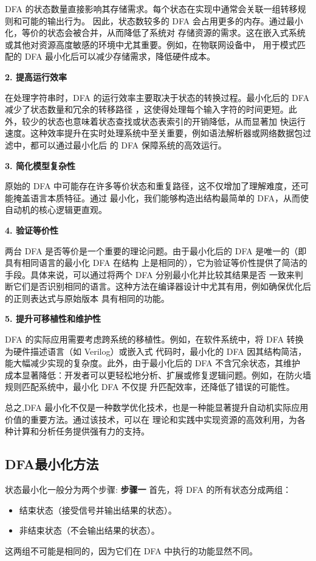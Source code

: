 \documentclass{article}
\begin{document}
DFA 的状态数量直接影响其存储需求。每个状态在实现中通常会关联一组转移规则和可能的输出行为。
因此，状态数较多的 DFA 会占用更多的内存。通过最小化，等价的状态会被合并，从而降低了系统对
存储资源的需求。这在嵌入式系统或其他对资源高度敏感的环境中尤其重要。例如，在物联网设备中，
用于模式匹配的 DFA 最小化后可以减少存储需求，降低硬件成本。

\textbf{2. 提高运行效率}

在处理字符串时，DFA 的运行效率主要取决于状态的转换过程。最小化后的 DFA 减少了状态数量和冗余的转移路径
，这使得处理每个输入字符的时间更短。此外，较少的状态也意味着状态查找或状态表索引的开销降低，从而显著加
快运行速度。这种效率提升在实时处理系统中至关重要，例如语法解析器或网络数据包过滤中，都可以通过最小化后
的 DFA 保障系统的高效运行。

\textbf{3. 简化模型复杂性}

原始的 DFA 中可能存在许多等价状态和重复路径，这不仅增加了理解难度，还可能掩盖语言本质特征。通过
最小化，我们能够构造出结构最简单的 DFA，从而使自动机的核心逻辑更直观。

\textbf{4. 验证等价性}

两台 DFA 是否等价是一个重要的理论问题。由于最小化后的 DFA 是唯一的（即具有相同语言的最小化 DFA 在结构
上是相同的），它为验证等价性提供了简洁的手段。具体来说，可以通过将两个 DFA 分别最小化并比较其结果是否
一致来判断它们是否识别相同的语言。这种方法在编译器设计中尤其有用，例如确保优化后的正则表达式与原始版本
具有相同的功能。

\textbf{5. 提升可移植性和维护性}

DFA 的实际应用需要考虑跨系统的移植性。例如，在软件系统中，将 DFA 转换为硬件描述语言（如 Verilog）或嵌入式
代码时，最小化的 DFA 因其结构简洁，能大幅减少实现的复杂度。此外，由于最小化后的 DFA 不含冗余状态，其维护
成本显著降低：开发者可以更轻松地分析、扩展或修复逻辑问题。例如，在防火墙规则匹配系统中，最小化 DFA 不仅提
升匹配效率，还降低了错误的可能性。

 总之,DFA 最小化不仅是一种数学优化技术，也是一种能显著提升自动机实际应用价值的重要方法。通过该技术，可以在
 理论和实践中实现资源的高效利用，为各种计算和分析任务提供强有力的支持。



\subsection{DFA最小化方法}
    状态最小化一般分为两个步骤:
    \textbf{步骤一}
    首先，将 DFA 的所有状态分成两组：
    \begin{itemize}
        \item 结束状态（接受信号并输出结果的状态）。
        \item 非结束状态（不会输出结果的状态）。 
    \end{itemize}
    这两组不可能是相同的，因为它们在 DFA 中执行的功能显然不同。   
\end{document}
